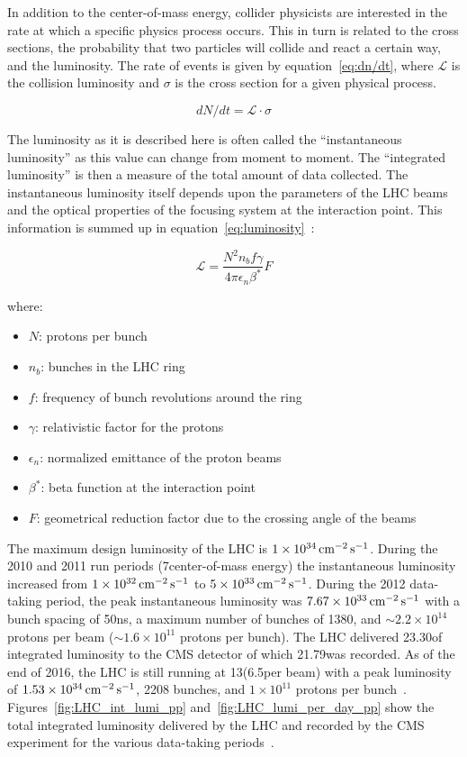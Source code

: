 In addition to the center-of-mass energy, collider physicists are interested in the rate at which a specific physics process occurs.
This in turn is related to the cross sections, the probability that two particles will collide and react a certain way, and the luminosity.
The rate of events is given by equation~\ref{eq:dn/dt}, where $\mathcal{L}$ is the collision luminosity and $\sigma$ is the cross section for a given physical process.

\begin{equation}
dN/dt=\mathcal{L}{\cdot}\sigma
\label{eq:dn/dt}
\end{equation}

The luminosity as it is described here is often called the ``instantaneous luminosity'' as this value can change from moment to moment.
The ``integrated luminosity'' is then a measure of the total amount of data collected.
The instantaneous luminosity itself depends upon the parameters of the LHC beams and the optical properties of the focusing system at the interaction point.
This information is summed up in equation~\ref{eq:luminosity}~\cite{1742-6596-455-1-012001}:

\begin{equation}
\mathcal{L}=\frac{N^{2}n_{b}f\gamma}{4\pi\epsilon_{n}\beta^{*}}F
\label{eq:luminosity}
\end{equation}

where:

\begin{itemize}
	\item $N$: protons per bunch
	\item $n_{b}$: bunches in the LHC ring
	\item $f$: frequency of bunch revolutions around the ring 
	\item $\gamma$: relativistic factor for the protons
	\item $\epsilon_{n}$: normalized emittance of the proton beams
	\item $\beta^{*}$: beta function at the interaction point
	\item $F$: geometrical reduction factor due to the crossing angle of the beams
\end{itemize}

The maximum design luminosity of the LHC is $1\times10^{34}\,\text{cm}^\text{$-$2}\,\text{s}^\text{$-$1}$.
During the 2010 and 2011 run periods (7\TeV center-of-mass energy) the instantaneous luminosity increased from $1\times10^{32}\,\text{cm}^\text{$-$2}\,\text{s}^\text{$-$1}$ to $5\times10^{33}\,\text{cm}^\text{$-$2}\,\text{s}^\text{$-$1}$.
During the 2012 data-taking period, the peak instantaneous luminosity was $7.67\times10^{33}\,\text{cm}^\text{$-$2}\,\text{s}^\text{$-$1}$ with a bunch spacing of 50\unit{ns}, a maximum number of bunches of 1380, and $\sim2.2\times10^{14}$ protons per beam ($\sim1.6\times10^{11}$ protons per bunch).
The LHC delivered 23.30\fbinv of integrated luminosity to the CMS detector of which 21.79\fbinv was recorded.
As of the end of 2016, the LHC is still running at 13\TeV (6.5\TeV per beam) with a peak luminosity of $1.53\times10^{34}\,\text{cm}^\text{$-$2}\,\text{s}^\text{$-$1}$, 2208 bunches, and $1\times10^{11}$ protons per bunch~\cite{CMSWebBasedMonitoring,LumiPublic}.
Figures~\ref{fig:LHC_int_lumi_pp} and~\ref{fig:LHC_lumi_per_day_pp} show the total integrated luminosity delivered by the LHC and recorded by the CMS experiment for the various data-taking periods~\cite{LumiPublic}.

